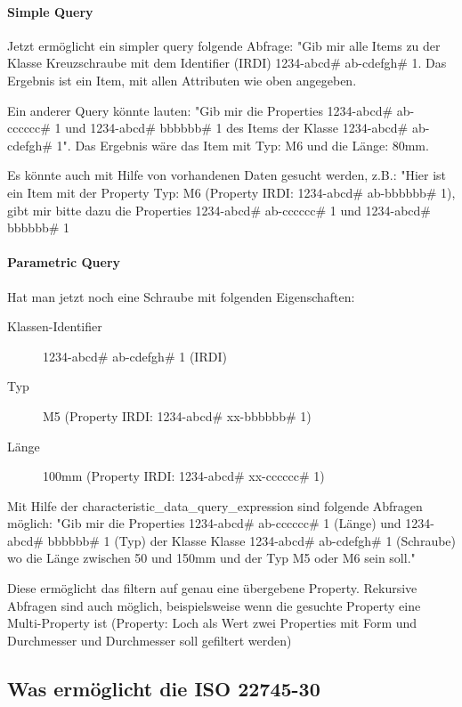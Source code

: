 \paragraph{Simple Query}

Jetzt ermöglicht ein simpler query folgende Abfrage: "Gib mir alle Items zu der Klasse Kreuzschraube mit dem Identifier (IRDI) 1234-abcd\# ab-cdefgh\# 1. Das Ergebnis ist ein Item, mit allen Attributen wie oben angegeben. 

Ein anderer Query könnte lauten: "Gib mir die Properties 1234-abcd\# ab-cccccc\# 1 und 1234-abcd\# bbbbbb\# 1 des Items der Klasse 1234-abcd\# ab-cdefgh\# 1". Das Ergebnis wäre das Item mit Typ: M6 und die Länge: 80mm.

Es könnte auch mit Hilfe von vorhandenen Daten gesucht werden, z.B.: "Hier ist ein Item mit der Property Typ: M6 (Property IRDI: 1234-abcd\# ab-bbbbbb\# 1), gibt mir bitte dazu die Properties 1234-abcd\# ab-cccccc\# 1 und 1234-abcd\# bbbbbb\# 1 

\paragraph{Parametric Query}

Hat man jetzt noch eine Schraube mit folgenden Eigenschaften:
\begin{description}
\item[Klassen-Identifier] 1234-abcd\# ab-cdefgh\# 1 (IRDI)
\item[Typ] M5 (Property IRDI: 1234-abcd\# xx-bbbbbb\# 1)
\item[Länge] 100mm (Property IRDI: 1234-abcd\# xx-cccccc\# 1)
\end{description}


Mit Hilfe der characteristic\_data\_query\_expression sind folgende Abfragen möglich: "Gib mir die Properties 1234-abcd\# ab-cccccc\# 1 (Länge) und 1234-abcd\# bbbbbb\# 1 (Typ) der Klasse Klasse 1234-abcd\# ab-cdefgh\# 1 (Schraube) wo die Länge zwischen 50 und 150mm und der Typ M5 oder M6 sein soll."


Diese ermöglicht das filtern auf genau eine übergebene Property. Rekursive Abfragen sind auch möglich, beispielsweise wenn die gesuchte Property eine Multi-Property ist (Property: Loch als Wert zwei Properties mit Form und Durchmesser und Durchmesser soll gefiltert werden)

\subsection{Was ermöglicht die ISO 22745-30}

